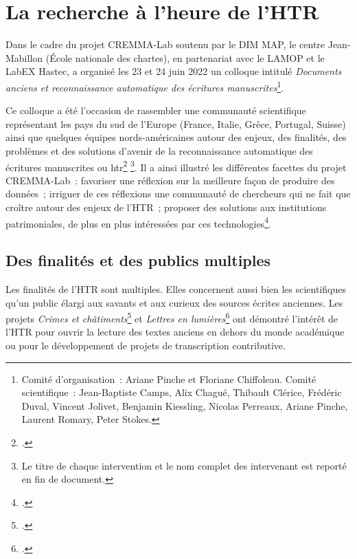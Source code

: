 \documentclass[a4paper,12pt,twoside]{book}
\begin{document}
		
		\section{La recherche à l'heure de l'HTR}
		
		Dans le cadre du projet CREMMA-Lab soutenu par le DIM MAP, le centre
		Jean-Mabillon (École nationale des chartes), en partenariat avec le
		LAMOP et le LabEX Hastec, a organisé les 23 et 24 juin 2022 un colloque
		intitulé \emph{Documents anciens et reconnaissance automatique des
			écritures manuscrites}\footnote{Comité d'organisation~: Ariane Pinche et
			Floriane Chiffoleau. Comité scientifique~: Jean-Baptiste Camps, Alix
			Chagué, Thibault Clérice, Frédéric Duval, Vincent Jolivet, Benjamin
			Kiessling, Nicolas Perreaux, Ariane Pinche, Laurent Romary, Peter
			Stokes.}.
		
		Ce colloque a été l'occasion de rassembler une communauté scientifique
		représentant les pays du sud de l'Europe (France, Italie, Grêce,
		Portugal, Suisse) ainsi que quelques équipes nords-américaines autour
		des enjeux, des finalités, des problèmes et des solutions d'avenir de la
		reconnaissance automatique des écritures manuscrites ou \gls{htr}\footcite{marguin-hamonDiscoursOuverturePresentation2022} \footnote{Le titre
			de chaque intervention et le nom complet des intervenant est reporté
			en fin de document.}. Il a ainsi illustré les différentes facettes du
		projet CREMMA-Lab~: favoriser une réflexion sur la meilleure façon de
		produire des données~; irriguer de ces réflexions une communauté de
		chercheurs qui ne fait que croître autour des enjeux de l'HTR~; proposer
		des solutions aux institutions patrimoniales, de plus en plus
		intéressées par ces technologies\footcite{campsCremmaLabProjectsTranscription2022}.
		
		\subsection{Des finalités et des publics multiples}
		
		Les finalités de l'HTR sont multiples. Elles concernent aussi bien les
		scientifiques qu'un public élargi aux savants et aux curieux des sources
		écrites anciennes. Les projets \textit{Crimes et châtiments}\footcite{paupeCursive17eSiecle2022a} et
		\textit{Lettres en lumières}\footcite{fizaineLettresLumieres2022} ont démontré l'intérêt de l'HTR pour
		ouvrir la lecture des textes anciens en dehors du monde académique ou
		pour le développement de projets de transcription contributive.
		
\end{document}
